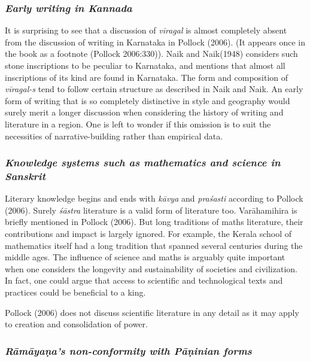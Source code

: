 \subsubsection {{\sl Early writing in Kannada}}
\vskip -4pt

It is surprising to see that a discussion of {\sl vīragal} is almost completely absent from the discussion of writing in Karnataka in Pollock (2006). (It appears once in the book as a footnote (Pollock 2006:330)). Naik and Naik(1948) considers such stone inscriptions to be peculiar to Karnataka, and mentions that almost all inscriptions of its kind are found in Karnataka. The form and composition of {\sl vīragal-s} tend to follow certain structure as described in Naik and Naik. An early form of writing that is so completely distinctive in style and geography would surely merit a longer discussion when considering the history of writing and literature in a region. One is left to wonder if this omission is to suit the necessities of narrative-building rather than empirical data. 
\vskip -10pt

\subsubsection{{\sl Knowledge systems such as mathematics and science in Sanskrit}}
\vskip -4pt

Literary knowledge begins and ends with {\sl kāvya} and {\sl praśasti} according to Pollock (2006). Surely {\sl śāstra} literature is a valid form of literature too. Varāha\-mihira is briefly mentioned in Pollock (2006). But long traditions of maths literature, their contributions and impact is largely ignored. For example, the Kerala school of mathematics itself had a long tradition that spanned several centuries during the middle ages. The influence of science and maths is arguably quite important when one considers the longevity and sustainability of societies and civilization. In fact, one could argue that access to scientific and technological texts and practices could be beneficial to a king. 

Pollock (2006) does not discuss scientific literature in any detail as it may apply to creation and consolidation of power. 

\subsubsection{{\sl Rāmāyaṇa’s non-conformity with Pāṇinian forms}}

